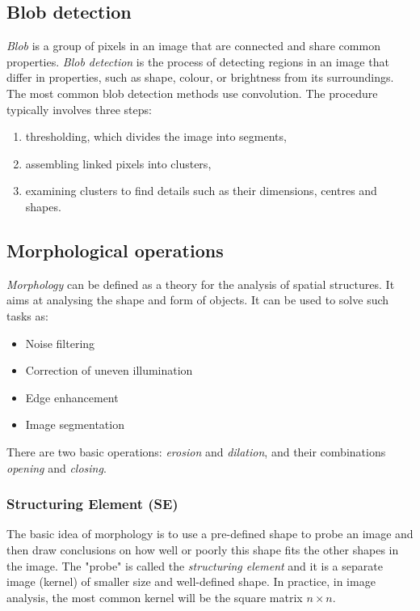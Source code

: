 \subsection{Blob detection}

\emph{Blob} is a group of pixels in an image that are connected and share common properties. \emph{Blob detection} is the process of detecting regions in an image that differ in properties, such as shape, colour, or brightness from its surroundings. The most common blob detection methods use convolution. The procedure typically involves three steps: 

\begin{enumerate}
    \item thresholding, which divides the image into segments,
    \item assembling linked pixels into clusters,
    \item examining clusters to find details such as their dimensions, centres and shapes. \cite{geeks_for_geeks_blob_detection}
\end{enumerate}



\subsection{Morphological operations}

\emph{Morphology} can be defined as a theory for the analysis of spatial structures. It aims at analysing the shape and form of objects. It can be used to solve such tasks as:

\begin{itemize}
    \item Noise filtering
    \item Correction of uneven illumination
    \item Edge enhancement
    \item Image segmentation
\end{itemize}

There are two basic operations: \emph{erosion} and \emph{dilation}, and their combinations \emph{opening} and \emph{closing}.

\subsubsection{Structuring Element (SE)}

The basic idea of morphology is to use a pre-defined shape to probe an image and then draw conclusions on how well or poorly this shape fits the other shapes in the image. The "probe" is called the \emph{structuring element} and it is a separate image (kernel) of smaller size and well-defined shape. In practice, in image analysis, the most common kernel will be the square matrix $ n \times n $.

